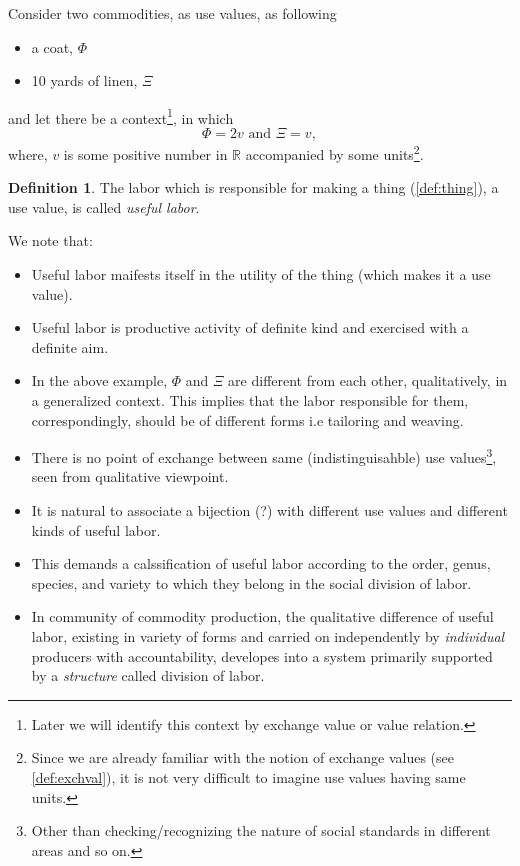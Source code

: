 \documentclass[12pt]{extarticle}
\theoremstyle{definition}
\newtheorem{definition}{Definition}[section]
\newenvironment{remark}[1][Remark]{\begin{trivlist}
\item[\hskip \labelsep {\bfseries #1}]}{\end{trivlist}}
\begin{document}
Consider two commodities, as use values, as following
\begin{itemize}
\item a coat, $\Phi$
\item 10 yards of linen, $\Xi$
\end{itemize}
and let there be a context\footnote{Later we will identify this context by exchange value or value relation.}, in which
\begin{equation}
  \label{eq:exvalphxi}
  \Phi = 2v \text{ and } \Xi = v,
\end{equation}
where, $v$ is some positive number in $\mathbb{R}$ accompanied by some units\footnote{Since we are already familiar with the notion of exchange values (see \ref{def:exchval}), it is not very difficult to imagine use values having same units.}.

\begin{definition}
  \label{def:usefullabor}
  The labor which is responsible for making a thing (\ref{def:thing}), a use value, is called \emph{useful labor}.
\end{definition}

\begin{remark}
  \label{rem:exval}
  We note that:
  \begin{itemize}
  \item Useful labor maifests itself in the utility of the thing (which makes it a use value).
    \item Useful labor is productive activity of definite kind and exercised with a definite aim.
  \item In the above example, $\Phi$ and $\Xi$ are different from each other, qualitatively, in a generalized context.  This implies that the labor responsible for them, correspondingly, should be of different forms i.e tailoring and weaving.
  \item There is no point of exchange between same (indistinguisahble) use values\footnote{Other than checking/recognizing the nature of social standards in different areas and so on.}, seen from qualitative viewpoint.
  \item It is natural to associate a bijection (?) with different use values and different kinds of useful labor.
  \item This demands a calssification of useful labor according to the order, genus, species, and variety to which they belong in the social division of labor.
    \item\label{it:divoflabor}  In community of commodity production, the qualitative difference of useful labor, existing in variety of forms and carried on independently by \emph{individual} producers with accountability, developes into a system primarily supported by a \emph{structure} called division of labor.
  \end{itemize}
\end{remark}
\end{document}
